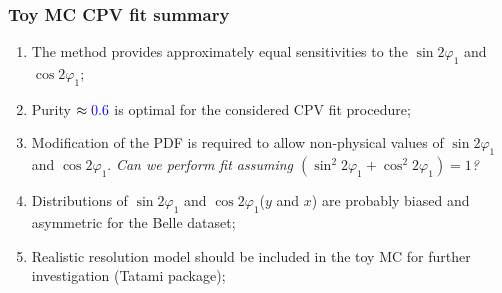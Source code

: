 \documentclass[10 pt,compress,mathserif]{beamer}
\newcommand{\cosbeta}{\ensuremath{\cos{2\varphi_1}}\xspace}
\newcommand{\sinbeta}{\ensuremath{\sin{2\varphi_1}}\xspace}
\newcommand{\cosbetasq}{\ensuremath{\cos^2{2\varphi_1}}\xspace}
\newcommand{\sinbetasq}{\ensuremath{\sin^2{2\varphi_1}}\xspace}
\begin{document}
%     

\begin{frame}
 \frametitle{Toy MC CPV fit summary}
 \begin{enumerate}
  \item The method provides approximately equal sensitivities to the \sinbeta and \cosbeta;
  \item Purity $\approx\textcolor{blue}{0.6}$ is optimal for the considered CPV fit procedure;
  \item Modification of the PDF is required to allow non-physical values of \sinbeta and \cosbeta. {\it Can we perform fit assuming $(\sinbetasq+\cosbetasq)=1$?}
  \item Distributions of \sinbeta and \cosbeta ($y$ and $x$) are probably biased and asymmetric for the Belle dataset;
  \item Realistic resolution model should be included in the toy MC for further investigation (Tatami package);
 \end{enumerate}
\end{frame}
\end{document}
